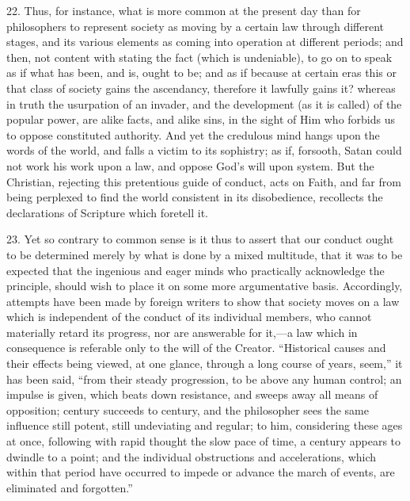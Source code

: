 22. Thus, for instance, what is more common at the present day than
for philosophers to represent society as moving by a certain law
through different stages, and its various elements as coming into
operation at different periods; and then, not content with stating the
fact (which is undeniable), to go on to speak as if what has been, and
is, ought to be; and as if because at certain eras this or that class
of society gains the ascendancy, therefore it lawfully gains it?
whereas in truth the usurpation of an invader, and the development (as
it is called) of the popular power, are alike facts, and alike sins,
in the sight of Him who forbids us to oppose constituted authority.
And yet the credulous mind hangs upon the words of the world, and
falls a victim to its sophistry; as if, forsooth, Satan could not work
his work upon a law, and oppose God's will upon system. But the
Christian, rejecting this pretentious guide of conduct, acts on Faith,
and far from being perplexed to find the world consistent in its
disobedience, recollects the declarations of Scripture which foretell
it.

23. Yet so contrary to common sense is it thus to assert that our
conduct ought to be determined merely by what is done by a mixed
multitude, that it was to be expected that the ingenious and eager
minds who practically acknowledge the principle, should wish to place
it on some more argumentative basis. Accordingly, attempts have been
made by foreign writers to show that society moves on a law which is
independent of the conduct of its individual members, who cannot
materially retard its progress, nor are answerable for it,—a law
which in consequence is referable only to the will of the Creator.
``Historical causes and their effects being viewed, at one glance,
through a long course of years, seem,'' it has been said,
``from their steady progression, to be above any human control; an
impulse is given, which beats down resistance, and sweeps away all
means of opposition; century succeeds to century, and the philosopher
sees the same influence still potent, still undeviating and regular;
to him, considering these ages at once, following with rapid thought
the slow pace of time, a century appears to dwindle to a point; and
the individual obstructions and accelerations, which within that
period have occurred to impede or advance the march of events, are
eliminated and forgotten.''

